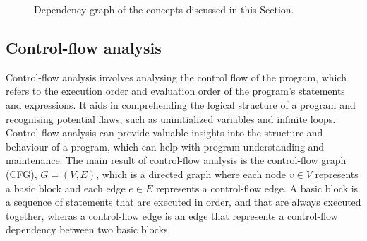 \begin{figure}[h]
    \centering
  \caption{Dependency graph of the concepts discussed in this Section.}
\end{figure}


\subsection{Control-flow analysis}

Control-flow analysis involves analysing the control flow of the program, which refers
to the execution order and evaluation order of the program's statements and expressions.
It aids in comprehending the logical structure of a program and recognising potential flaws,
such as uninitialized variables and infinite loops. Control-flow analysis
can provide valuable insights into the structure and behaviour of a program,
which can help with program understanding and maintenance.
The main result of control-flow analysis is the control-flow graph (CFG), $G = (V, E)$,
which is a directed graph where each node $v \in V$ represents a basic block
and each edge $e \in E$ represents a control-flow edge. A basic block is a sequence of
statements that are executed in order, and that are always executed together, 
wheras a control-flow edge is an edge that represents a control-flow dependency between two basic blocks.

